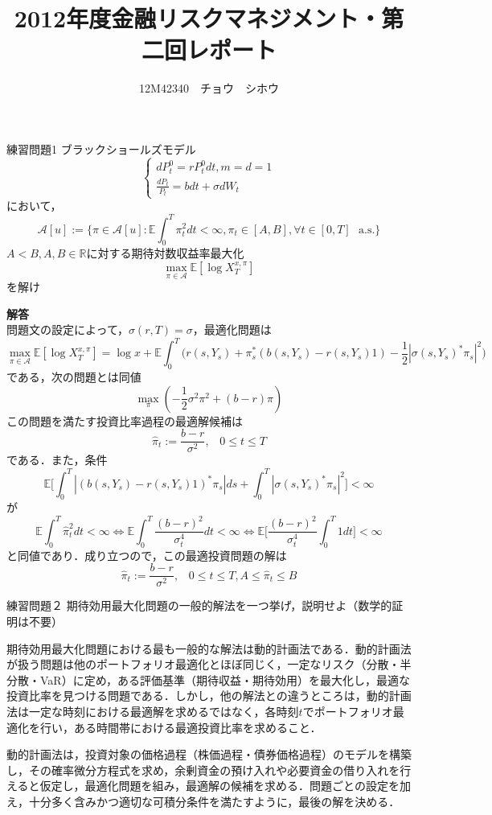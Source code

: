 \documentclass[a4paper,11pt]{jsarticle}
\title{2012年度金融リスクマネジメント・第二回レポート}
\author{12M42340　チョウ　シホウ}
\date{}
\numberwithin{theorem}{section}  %
\numberwithin{equation}{section} %
\begin{document}
{}
\renewcommand{\thepart}{\arabic{part}}

\maketitle
\begin{itembox}[l]{練習問題1}
ブラックショールズモデル
\[
\begin{cases}
dP_t^0 = rP_t^0dt,m=d=1\\
\frac{dP_t}{P_t} = bdt + \sigma dW_t
\end{cases}
\]
において，
\[
\mathcal{A}[u]:=\{ \pi \in \mathcal{A}[u] :  \mathbb{E}\int_0^T \pi_t^2 dt < \infty, \pi_t \in [A,B],\forall t \in [0,T]\,\,\,\,\text{a.s.} \}
\]
$A<B,A,B\in\mathbb{R}$に対する期待対数収益率最大化
\[
\max_{\pi \in \mathcal{A} }\mathbb{E}[\log X_T^{x,\pi}]
\]
を解け
\end{itembox}
{\bf 解答}\\

問題文の設定によって，$\sigma(r,T) = \sigma$，最適化問題は
\[
\max_{\pi \in \mathcal{A} }\mathbb{E}[\log X_T^{x,\pi}] = \log x+\mathbb{E}\int_0^T \Bigr( r(s,Y_s) + \pi_s^*(b(s,Y_s)-r(s,Y_s)1) - \frac{1}{2}|\sigma(s,Y_s)^*\pi_s|^2 \Bigr)
\]
である，次の問題とは同値
\[
\max_{\pi} (-\frac{1}{2}\sigma^2\pi^2+(b-r)\pi)
\]
この問題を満たす投資比率過程の最適解候補は
\[
\hat{\pi}_t := \frac{b-r}{\sigma^2},\,\,\,\,\, 0\le t \le T
\]
である．また，条件
\[
\mathbb{E}\Bigr[ \int_0^T| (b(s,Y_s) -r(s, Y_s)1)^*\pi_s |ds + \int_0^T |\sigma(s,Y_s)^*\pi_s|^2 \Bigr] < \infty
\]
が\[
\mathbb{E}\int_0^T \hat{\pi}_t^2 dt < \infty \Leftrightarrow
\mathbb{E}\int_0^T \frac{(b-r)^2}{\sigma_t^4} dt < \infty \Leftrightarrow
\mathbb{E}\Bigr[ \frac{(b-r)^2}{\sigma_t^4} \int_0^T 1 dt \Bigr] < \infty
\]
と同値であり．成り立つので，この最適投資問題の解は
\[
\hat{\pi}_t := \frac{b-r}{\sigma^2},\,\,\,\,\, 0\le t \le T, A \le \hat{\pi}_t \le B
\]


\begin{itembox}[l]{練習問題２}
期待効用最大化問題の一般的解法を一つ挙げ，説明せよ（数学的証明は不要）
\end{itembox}

期待効用最大化問題における最も一般的な解法は動的計画法である．動的計画法が扱う問題は他のポートフォリオ最適化とほぼ同じく，一定なリスク（分散・半分散・VaR）に定め，ある評価基準（期待収益・期待効用）を最大化し，最適な投資比率を見つける問題である．しかし，他の解法との違うところは，動的計画法は一定な時刻における最適解を求めるではなく，各時刻$t$でポートフォリオ最適化を行い，ある時間帯における最適投資比率を求めること．

動的計画法は，投資対象の価格過程（株価過程・債券価格過程）のモデルを構築し，その確率微分方程式を求め，余剰資金の預け入れや必要資金の借り入れを行えると仮定し，最適化問題を組み，最適解の候補を求める．問題ごとの設定を加え，十分多く含みかつ適切な可積分条件を満たすように，最後の解を決める．
\end{document}

